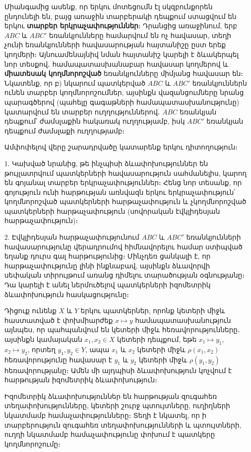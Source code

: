 \documentclass[./main.tex]{subfiles}
\begin{document}
\par Միանգամից ասենք, որ երկու մոտեցումն էլ սկզբունքորեն ընդունելի են, բայց առաջին տարբերակի դեպքում ստացվում են երկու \textbf{տարբեր երկրաչափություններ}։ Դրանցից առաջինում, երբ $ABC$ և $ABC'$ եռանկյունները համարվում են ոչ հավասար, տեղի չունի եռանկյունների հավասարության հայտանիշը ըստ երեք կողմերի։ Այնուամենայնիվ նման հայտանիշ կարելի է ձևակերպել նոր տեսքով․ համապատասխանաբար հավասար կողմերով և \textbf{միատեսակ կողմնորոշված} եռանկյունները միմյանց հավասար են։ Նկատենք, որ բ) նկարում պատկերված $ABC$ և $ABC'$ եռանկյուններն ունեն տարբեր կողմնորոշումներ, այսինքն վազանցումները նրանց պարագծերով (պահելը գագաթների համապատասխանությունը) կատարվում են տարբեր ուղղություններով․ $ABC$ եռանկյան դեպքում՝ ժամսլաքին հակառակ ուղղությամբ, իսկ $ABC'$ եռանկյան դեպքում ժամսլաքի ուղղությամբ։
\par Ամփոփելով վերը շարադրվածը կատարենք երկու դիտողություն։
\par 1. Կախված նրանից, թե ինչպիսի ձևափոխություններ են թույլատրվում պատկերների հավասարություն սահմանելիս, կարող են գոյանալ տարբեր երկրաչափություններ։ Հենց նոր տեսանք, որ գոյություն ունի հարթության առնվազն երկու երկրաչափություն՝ կողմնորոշված պատկերների հարթաչափություն և չկողմնորոշված պատկերների հարթաչափություն (սովորական էվկլիդեսյան հարթաչափություն)։
\par 2. Էվկլիդեսյան հարթաչափությունում $ABC$ և $ABC'$ եռանկյունների հավասարությունը վերադրումով հիմնավորելու համար ստիպված եղանք դուրս գալ հարթությունից։ Մինչդեռ ցանկալի է, որ հարթաչափությունը լինի ինքնաբավ, այսինքն ձևավորվի սեփական տիրույթում առանց դիմելու տարածության օգնությանը։ Դա կարելի է անել ներմուծելով պատկերների իզոմետրիկ ձևափոխություն հասկացությունը։
\par Դիցուք ունենք $X$ և $Y$ երկու պատկերներ, որոնք կետերի միջև հաստատված է փոխմիարժեք $x\mapsto y$ համապատասխանություն այնպես, որ պահպանվում են կետերի միջև հեռավորությունները․ այսինքն կամայական $x_1,x_2\in X$ կետերի դեպքում, եթե  $x_1\mapsto y_1$, $x_2\mapsto y_2$, որտեղ $y_1,y_2\in Y$, ապա $x_1$ և $x_2$ կետերի միջև $\rho(x_1,x_2)$ հեռավորությունը հավասար է $y_1$ և $y_2$ կետերի միջև $\rho(y_1,y_2)$ հեռավորությանը։ Ամեն մի այդպիսի ձևափոխություն կոչվում է հարթության իզոմետրիկ ձևափոխություն։
\par Իզոմետրիկ ձևափոխություններ են հարթության զուգահեռ տեղափոխությունները, կետերի շուրջ պտույտները, ուղիղների նկատմամբ համաչափությունները։ Տեղի է նկատել, որ ի տարբերություն զուգահեռ տեղափոխությունների և պտույտների, ուղղի նկատմամբ համաչափությունը փոխում է պատկերը կողմնորոշումը։
\end{document}
